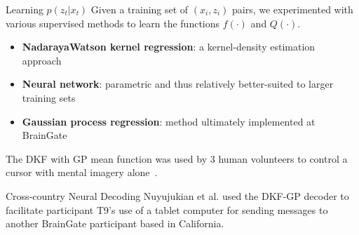 \documentclass[aspectratio=169,19pt,xetex,handout]{beamer}
\begin{document}
\begin{frame}{Learning $p(z_t|x_t)$}
\Large
Given a training set of $(x_i,z_i)$ pairs, we experimented with various supervised methods to learn the functions $f(\cdot)$ and $Q(\cdot)$.
\begin{itemize}
    \item \textbf{Nadaraya{\textendash}Watson kernel regression}: a kernel-density estimation approach~\cite{Nad64,Wat64}
    \item \textbf{Neural network}: parametric and thus relatively better-suited to larger training sets~\cite{Bis06}
    \item \textbf{Gaussian process regression}: method ultimately implemented at BrainGate \cite{Ras06}
\end{itemize}
\end{frame}

\begin{frame}[b]{}

\begin{block}{}
\Large
\color{black} The DKF with GP mean function was used by 3 human volunteers to control a cursor with mental imagery alone~\cite{Bra18}.
\end{block}


\end{frame}

\begin{frame}{Cross-country Neural Decoding}
\Large
Nuyujukian et al. used the DKF-GP decoder to facilitate participant T9's use of a tablet computer for sending messages to another BrainGate participant based in California.
\end{frame}
\end{document}
